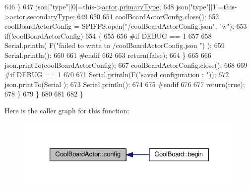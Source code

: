 \begin{DoxyCode}
646             \}
647             json[\textcolor{stringliteral}{"type"}][0]=this->\hyperlink{class_cool_board_actor_a8f190db9f7a39fddbcef7f152da970e9}{actor}.\hyperlink{struct_cool_board_actor_1_1state_a8a0b318fd2814cf67fe74ee8164df55e}{primaryType};
648             json[\textcolor{stringliteral}{"type"}][1]=this->\hyperlink{class_cool_board_actor_a8f190db9f7a39fddbcef7f152da970e9}{actor}.\hyperlink{struct_cool_board_actor_1_1state_a44e8f69868f2491b79ed075f84aa0fcb}{secondaryType};
649             
650 
651             coolBoardActorConfig.close();           
652             coolBoardActorConfig = SPIFFS.open(\textcolor{stringliteral}{"/coolBoardActorConfig.json"}, \textcolor{stringliteral}{"w"});          
653             \textcolor{keywordflow}{if}(!coolBoardActorConfig)
654             \{
655             
656 \textcolor{preprocessor}{            #if DEBUG == 1 }
657 
658                 Serial.println( F(\textcolor{stringliteral}{"failed to write to /coolBoardActorConfig.json "}) );
659                 Serial.println();
660             
661 \textcolor{preprocessor}{            #endif}
662                 
663                 \textcolor{keywordflow}{return}(\textcolor{keyword}{false});          
664             \}  
665 
666             json.printTo(coolBoardActorConfig);
667             coolBoardActorConfig.close();
668 
669 \textcolor{preprocessor}{        #if DEBUG == 1 }
670             
671             Serial.println(F(\textcolor{stringliteral}{"saved configuration : "}));
672             json.printTo(Serial );
673             Serial.println();       
674         
675 \textcolor{preprocessor}{        #endif}
676 
677             \textcolor{keywordflow}{return}(\textcolor{keyword}{true}); 
678         \}
679     \}   
680     
681 
682 \}
\end{DoxyCode}
Here is the caller graph for this function\+:
\nopagebreak
\begin{figure}[H]
\begin{center}
\leavevmode
\includegraphics[width=326pt]{dc/d69/class_cool_board_actor_a5af5538fc7d169f63127e06d5219bcd4_icgraph}
\end{center}
\end{figure}
\mbox{\label{class_cool_board_actor_a96a45658d32c6b95caa2f385c7da32cd}} 
